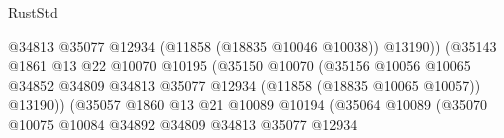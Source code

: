 \begin{lexlean}{RustStd}
\begin{coremodule}
                                                          @34813
                                                          @35077
                                                          @12934
                                                          (@11858 (@18835 @10046 @10038))
                                                          @13190))
                                                      (@35143
                                                        @1861
                                                        @13
                                                        @22
                                                        @10070
                                                        @10195
                                                        (@35150
                                                          @10070
                                                          (@35156
                                                            @10056
                                                            @10065
                                                            @34852
                                                            @34809
                                                            @34813
                                                            @35077
                                                            @12934
                                                            (@11858 (@18835 @10065 @10057))
                                                            @13190))
                                                        (@35057
                                                          @1860
                                                          @13
                                                          @21
                                                          @10089
                                                          @10194
                                                          (@35064
                                                            @10089
                                                            (@35070
                                                              @10075
                                                              @10084
                                                              @34892
                                                              @34809
                                                              @34813
                                                              @35077
                                                              @12934

\end{coremodule}
\end{lexlean}

